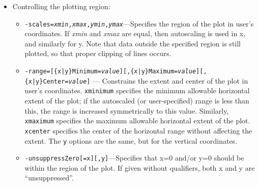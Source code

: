 \begin{itemize}
\begin{itemize}
\begin{itemize}
{\tt linetype} specifies the line type to use for the arrows, using the same mechanism as for lines
in the {\tt -graphic} switch.  The default is 0.

{\tt cartesianData}, {\tt polarData}, and {\tt scalarData} specify the type of data being provided.
For the first two, one must have specified both {\em x1Name} and {\em y1NameList} in the plot
request; for {\tt cartesianData}, x1 and y1 are the x and y vector components, while for {\tt
polarData} x1 is the length and y1 is the angle in radians from the positive x direction.

{\tt centered} specifies that arrows should be centered on the corresponding (x, y) point; by
default, the arrow starts at the (x, y) point.  {\tt singleBarb} specifies that arrows should have
only a single barb, rather than the default two barbs; this can be significantly faster for large
amounts of data.  {\tt barbLength} and {\tt barbAngle} specify the length and angle of arrow barbs;
the barb length is a specified as a fraction of the arrow length, which the barb angle is specified
in degrees.

  \item {\tt -linetypeDefault={\em integer}[,thickness={\em value}]}--- Specifies the default line type for borders, legend
        text, labels, axes, and so on.  If not given, 0 is used.

\end{itemize}

\item Controlling the plotting region:
  \begin{itemize} 

   \item {\tt -scales={\em xmin},{\em xmax},{\em ymin},{\em ymax}}---Specifies the region of the plot in user's
coordinates.  If {\em xmin} and {\em xmax} are equal, then autoscaling is used in x, and similarly for y. Note
that data outside the specified region is still plotted, so that proper clipping of lines occurs.
 
 \item {\tt -range=[\{x|y\}Minimum={\em value}][,\{x|y\}Maximum={\em value}][,\{x|y\}Center={\em value}]}
        --- Constrains the extent
        and center of the plot in user's coordinates.  {\tt xminimum} specifies the minimum allowable
        horizontal extent of the plot; if the autoscaled (or user-specified) range is less than this, the
        range is increased symmetrically to this value.  Similarly, {\tt xmaximum} specifies the maximum
        allowable horizontal extent of the plot.  {\tt xcenter} specifies the center of the horizontal
        range without affecting the extent.  The {\tt y} options are the same, but for the vertical
        coordinates.
  \item {\tt -unsuppressZero[=x][,y]}---Specifies that x=0 and/or y=0 should be within the region of
the plot.  If given without qualifiers, both x and y are ``unsuppressed''.


\end{itemize}
\end{itemize}
\end{itemize}
